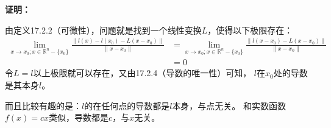 \documentclass{article}
\begin{document}
\textbf{证明：}

由定义17.2.2（可微性），问题就是找到一个线性变换$L$，使得以下极限存在：
\begin{align*}
  \lim\limits_{x \to x_0; x \in \mathbb{R}^n - \{x_0\}} \frac{\|l(x) - l(x_0) - L(x - x_0)\|}{\|x - x_0\|}
   & = \lim\limits_{x \to x_0; x \in \mathbb{R}^n - \{x_0\}} \frac{\|l(x - x_0) - L(x - x_0)\|}{\|x - x_0\|} \\
   & = 0
\end{align*}
令$L = l$以上极限就可以存在，又由17.2.4（导数的唯一性）可知，
$l$在$x_0$处的导数是其本身$l$。

而且比较有趣的是：$l$的在任何点的导数都是$l$本身，与点无关。
和实数函数$f(x) = c x$类似，导数都是$c$，与$x$无关。
\end{document}

